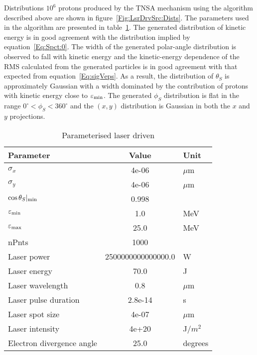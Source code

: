 Distributions $10^6$ protons produced by the TNSA mechanism using the
algorithm described above are shown in
figure~\ref{Fig:LsrDrvSrc:Dists}.
The parameters used in the algorithm are presented in
table~\ref{Tab:Src:Param}.
The generated distribution of kinetic energy is in good agreement with
the distribution implied by equation~\ref{Eq:Spct:0}.
The width of the generated polar-angle distribution is observed to
fall with kinetic energy and the kinetic-energy dependence of the RMS
calculated from the generated particles is in good agreement with that
expected from equation~\ref{Eq:sigVeps}.
As a result, the distribution of $\theta_S$ is approximately Gaussian
with a width dominated by the contribution of protons with kinetic
energy close to $\varepsilon_{\rm min}$.
The generated $\phi_S$ distribution is flat in the range
$0^\circ < \phi_S < 360^\circ$ and the $(x, y)$ distribution is
Gaussian in both the $x$ and $y$ projections.
\begin{table}
  \caption{Parameterised laser driven}
  \label{Tab:Src:Param}
  \begin{center}
    \begin{tabular}{|l|c|l|}
      \hline
        \textbf{Parameter} & \textbf{Value} & \textbf{Unit} \\ 
        \hline
        $\sigma_x$&4e-06&$\mu$m \\ 
        $\sigma_y$&4e-06&$\mu$m \\ 
        $\cos\theta_S |_{\rm min}$&0.998& \\ 
        $\varepsilon_{\rm min}$&1.0&MeV \\ 
        $\varepsilon_{\rm max}$&25.0&MeV \\ 
        nPnts&1000& \\ 
        Laser power&2500000000000000.0&W \\ 
        Laser energy&70.0&J \\ 
        Laser wavelength&0.8&$\mu$m \\ 
        Laser pulse duration&2.8e-14&s \\ 
        Laser spot size&4e-07&$\mu$m \\ 
        Laser intensity&4e+20&J$/m^2$ \\ 
        Electron divergence angle&25.0&degrees \\ 
      \hline
    \end{tabular}
  \end{center}
\end{table}
